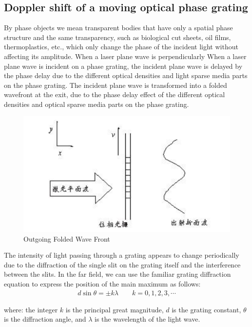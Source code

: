 \documentclass[UTF8]{article}
\begin{document}
    \subsection{Doppler shift of a moving optical phase grating}
    By phase objects we mean transparent bodies that have only a spatial phase structure and the same transparency, such as biological cut sheets, oil films, thermoplastics, etc., which only change the phase of the incident light without affecting its amplitude. When a laser plane wave is perpendicularly When a laser plane wave is incident on a phase grating, the incident plane wave is delayed by the phase delay due to the different optical densities and light sparse media parts on the phase grating. The incident plane wave is transformed into a folded wavefront at the exit, due to the phase delay effect of the different optical densities and optical sparse media parts on the phase grating.
	\begin{figure}[H]
	    	\centering
	    	\includegraphics[clip,scale=1,trim={0 0 0 0}]{fig/fig2.png}
	        \caption{Outgoing Folded Wave Front}
	        \label{figure.2}
    \end{figure}  
    
   The intensity of light passing through a grating appears to change periodically due to the diffraction of the single slit on the grating itself and the interference between the slits. In the far field, we can use the familiar grating diffraction equation to express the position of the main maximum as follows:
   \begin{eqnarray}
   d\sin \theta =\pm k\lambda \qquad k=0,1,2,3,\cdots 
   \end{eqnarray}
   
  where: the integer $k$ is the principal great magnitude, $d$ is the grating constant, $\theta$ is the diffraction angle, and $\lambda$ is the wavelength of the light wave.
  
\end{document}
